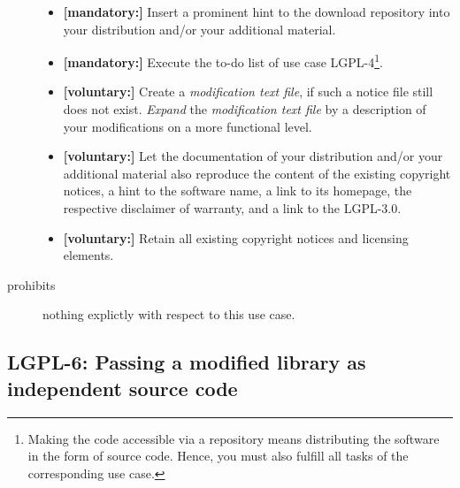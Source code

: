 \begin{description}
\begin{itemize}
  \item \textbf{[mandatory:]} Insert a prominent hint to the download repository
  into your distribution and/or your additional material.
  
  \item \textbf{[mandatory:]} Execute the to-do list of use case LGPL-4\footnote{
  Making the code accessible via a repository means distributing the software in
  the form of source code. Hence, you must also fulfill all tasks of the
  corresponding use case.}.
    
  \item \textbf{[voluntary:]} Create a \emph{modification text file}, if such a
  notice file still does not exist. \emph{Expand} the \emph{modification text
  file} by a description of your modifications on a more functional level.
  
  \item \textbf{[voluntary:]} Let the documentation of your distribution and/or
  your additional material also reproduce the content of the existing
  copyright notices, a hint to the software name, a link to its homepage,
  the respective disclaimer of warranty, and a link to the LGPL-3.0.
  
  \item \textbf{[voluntary:]} Retain all existing copyright notices and
  licensing elements. 


\end{itemize}

\item[prohibits] nothing explictly with respect to this use case.

\end{description}

\subsection{LGPL-6: Passing a modified library as independent source code}
\label{OSUC-08S-LGPL}

